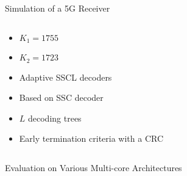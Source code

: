 \begin{frame}{Simulation of a 5G Receiver}
\begin{columns}
\begin{column}[T]{4cm}
\begin{itemize}
      \item $K_1 = 1755$
      \item $K_2 = 1723$
      \vspace{0.3cm}
      \item Adaptive SSCL decoders
      \item Based on SSC decoder
      \item $L$ decoding trees
      \item Early termination criteria with a CRC
    \end{itemize}
  \end{column}
  \end{columns}
\end{frame}

\begin{frame}{Evaluation on Various Multi-core Architectures}


\end{frame}
